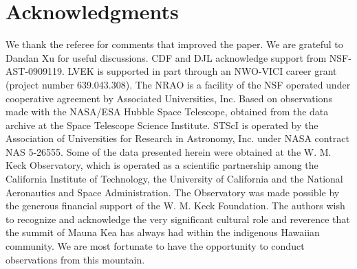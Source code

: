 \documentclass[a4paper,fleqn,usenatbib,useAMS]{mnras}
\begin{document}

\section*{Acknowledgments}
We thank the referee for comments that improved the paper.  We are grateful to Dandan Xu for useful discussions. CDF and DJL acknowledge support from NSF-AST-0909119.  LVEK is supported in part through an NWO-VICI career grant (project number 639.043.308). The NRAO is a facility of the NSF operated under cooperative agreement by Associated Universities, Inc. Based on observations made with the NASA/ESA Hubble Space Telescope, obtained from the data archive at the Space Telescope Science Institute. STScI is operated by the Association of Universities for Research in Astronomy, Inc. under NASA contract NAS 5-26555. Some of the data presented herein were obtained at the W. M. Keck Observatory, which is operated as a scientific partnership among the California Institute of Technology, the University of California and the National Aeronautics and Space Administration. The Observatory was made possible by the generous financial support of the W. M. Keck Foundation. The authors wish to recognize and acknowledge the very significant cultural role and reverence that the summit of Mauna Kea has always had within the indigenous Hawaiian community.  We are most fortunate to have the opportunity to conduct observations from this mountain.






\bsp
\label{lastpage}
\end{document}
